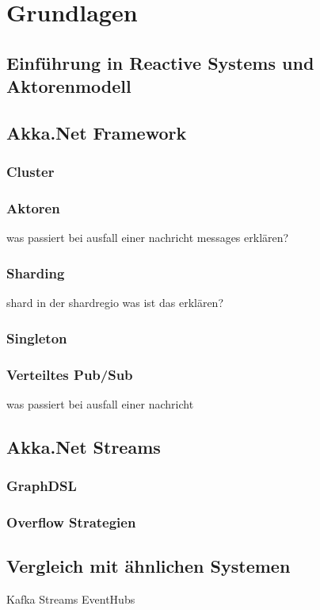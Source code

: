 \chapter{Grundlagen}

\section{Einführung in Reactive Systems und Aktorenmodell}

\section{Akka.Net Framework}

\subsection{Cluster}
\subsection{Aktoren}
was passiert bei ausfall einer nachricht messages erklären?
\subsection{Sharding}
shard in der shardregio was ist das erklären?
\subsection{Singleton}
\subsection{Verteiltes Pub/Sub}
was passiert bei ausfall einer nachricht 

\section{Akka.Net Streams}

\subsection{GraphDSL}
\subsection{Overflow Strategien}


\section{Vergleich mit ähnlichen Systemen}
Kafka Streams EventHubs